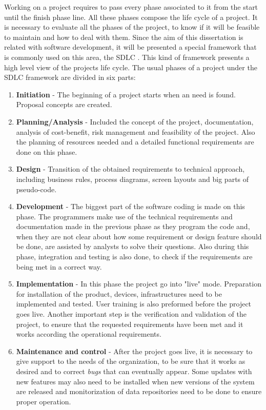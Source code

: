 \documentclass[mim_thesis.tex]{subfiles}
\begin{document}
Working on a project requires to pass every phase associated to it from the start until the finish phase line. All these phases compose the life cycle of a project. It is necessary to evaluate all the phases of the project, to know if it will be feasible to maintain and how to deal with them. Since the aim of this dissertation is related with software development, it will be presented a special framework that is commonly used on this area, the \ac{SDLC} \citep{wilcox2014software}. This kind of framework presents a high level view of the projects life cycle. The usual phases of a project under the SDLC framework are divided in six parts:
\begin{enumerate}
\item \textbf{Initiation} - The beginning of a project starts when an need is found. Proposal concepts are created.
\item \textbf{Planning/Analysis} - Included the concept of the project, documentation, analysis of cost-benefit, risk management and feasibility of the project. Also the planning of resources needed and a detailed functional requirements are done on this phase. 
\item \textbf{Design} - Transition of the obtained requirements to technical approach, including business rules, process diagrams, screen layouts and big parts of pseudo-code.  
\item \textbf{Development} - The biggest part of the software coding is made on this phase. The programmers make use of the technical requirements and documentation made in the previous phase as they program the code and, when they are not clear about how some requirement or design feature should be done, are assisted by analysts to solve their questions. Also during this phase, integration and testing is also done, to check if the requirements are being met in a correct way. 
\item \textbf{Implementation} - In this phase the project go into "live" mode. Preparation for installation of the product, devices, infrastructures need to be implemented and tested. User training is also preformed before the project goes live. Another important step is the verification and validation of the project, to ensure that the requested requirements have been met and it works according the operational requirements.  
\item \textbf{Maintenance and control} - After the project goes live, it is necessary to give support to the needs of the organization, to be sure that it works as desired and to correct \textit{bugs} that can eventually appear. Some updates with new features may also need to be installed when new versions of the system are released and monitorization of data repositories need to be done to ensure proper operation.
\end{enumerate}
\end{document}
